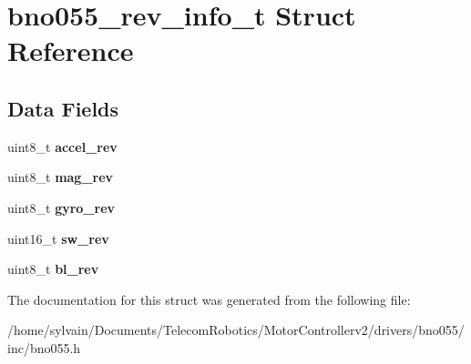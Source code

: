 \hypertarget{structbno055__rev__info__t}{}\section{bno055\+\_\+rev\+\_\+info\+\_\+t Struct Reference}
\label{structbno055__rev__info__t}
\subsection*{Data Fields}
\begin{DoxyCompactItemize}
\item 
\hypertarget{structbno055__rev__info__t_a7ce0583d983f23abd4c8288e9a0658cc}{}\label{structbno055__rev__info__t_a7ce0583d983f23abd4c8288e9a0658cc} 
uint8\+\_\+t {\bfseries accel\+\_\+rev}
\item 
\hypertarget{structbno055__rev__info__t_a1932017c08d48bbfaf343cb7d6ea0235}{}\label{structbno055__rev__info__t_a1932017c08d48bbfaf343cb7d6ea0235} 
uint8\+\_\+t {\bfseries mag\+\_\+rev}
\item 
\hypertarget{structbno055__rev__info__t_a1a5561ae55fb129d0c1b67f83f5e89b4}{}\label{structbno055__rev__info__t_a1a5561ae55fb129d0c1b67f83f5e89b4} 
uint8\+\_\+t {\bfseries gyro\+\_\+rev}
\item 
\hypertarget{structbno055__rev__info__t_a9f13818162202ecab12bd0a828d00dac}{}\label{structbno055__rev__info__t_a9f13818162202ecab12bd0a828d00dac} 
uint16\+\_\+t {\bfseries sw\+\_\+rev}
\item 
\hypertarget{structbno055__rev__info__t_aef294e8fc19a20e8d2393723e6a4b51c}{}\label{structbno055__rev__info__t_aef294e8fc19a20e8d2393723e6a4b51c} 
uint8\+\_\+t {\bfseries bl\+\_\+rev}
\end{DoxyCompactItemize}


The documentation for this struct was generated from the following file\+:\begin{DoxyCompactItemize}
\item 
/home/sylvain/\+Documents/\+Telecom\+Robotics/\+Motor\+Controllerv2/drivers/bno055/inc/bno055.\+h\end{DoxyCompactItemize}
